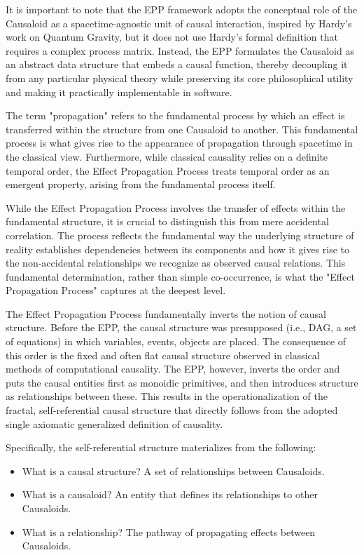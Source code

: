 It is important to note that the EPP framework adopts the conceptual role of the Causaloid as a spacetime-agnostic unit of causal interaction, inspired by Hardy’s work on Quantum Gravity, but it does not use Hardy's formal definition that requires a complex process matrix.  Instead, the EPP formulates the Causaloid as an abstract data structure that embeds a causal function, thereby decoupling it from any particular physical theory while preserving its core philosophical utility and making it practically implementable in software.

The term "propagation" refers to the fundamental process by which an effect is transferred within the structure from one Causaloid to another. This fundamental process is what gives rise to the appearance of propagation through spacetime in the classical view. Furthermore, while classical causality relies on a definite temporal order, the Effect Propagation Process treats temporal order as an emergent property, arising from the fundamental process itself.

While the Effect Propagation Process involves the transfer of effects within the fundamental structure, it is crucial to distinguish this from mere accidental correlation. The process reflects the fundamental way the underlying structure of reality establishes dependencies between its components and how it gives rise to the non-accidental relationships we recognize as observed causal relations. This fundamental determination, rather than simple co-occurrence, is what the "Effect Propagation Process" captures at the deepest level.

 The Effect Propagation Process fundamentally inverts the notion of causal structure. Before the EPP, the causal structure was presupposed (i.e., DAG, a set of equations) in which variables, events, objects are placed. The consequence of this order is the fixed and often flat causal structure observed in classical methods of computational causality. The EPP, however, inverts the order and puts the causal entities first as monoidic primitives, and then introduces structure as relationships between these. This results in the operationalization of the fractal, self-referential causal structure that directly follows from the adopted single axiomatic generalized definition of causality. 
 
Specifically, the self-referential structure materializes from the following:

\begin{itemize}
	\item What is a causal structure? A set of relationships between Causaloids.
 	\item What is a causaloid? An entity that defines its relationships to other Causaloids. 
	\item What is a relationship? The pathway of propagating effects between Causaloids.
\end{itemize}


